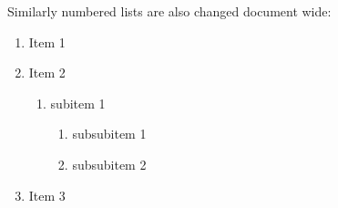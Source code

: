 Similarly numbered lists are also changed document wide:

\begin{enumerate}
    \item Item 1
    \item Item 2
    \begin{enumerate}
        \item subitem 1
        \begin{enumerate}
            \item subsubitem 1
            \item subsubitem 2
        \end{enumerate}
    \end{enumerate}
    \item Item 3
\end{enumerate}




